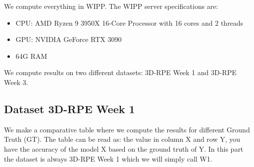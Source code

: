 We compute everything in WIPP. The WIPP server specifications are:
\begin{itemize}
  \item CPU: AMD Ryzen 9 3950X 16-Core Processor with 16 cores and 2 threads
  \item GPU: NVIDIA GeForce RTX 3090
  \item 64G RAM
\end{itemize}

We compute results on two different datasets: 3D-RPE Week 1 and 3D-RPE Week 3.

\subsection{Dataset 3D-RPE Week 1}


We make a comparative table where we compute the results for different Ground
Truth (GT). The table can be read as: the value in column X and row Y, you have
the accuracy of the model X based on the ground truth of Y. In this part the
dataset is always 3D-RPE Week 1 which we will simply call W1.

